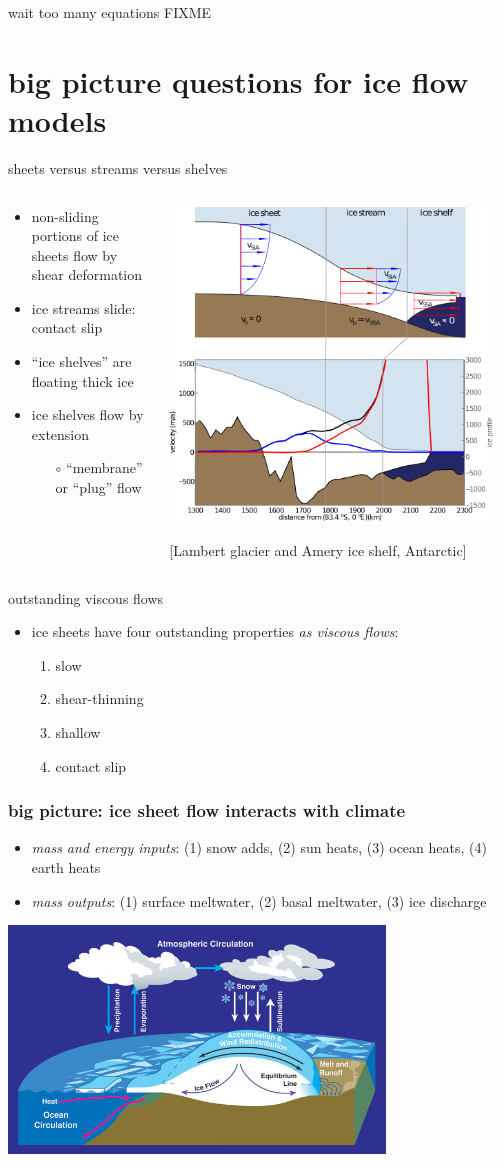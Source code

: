 \documentclass[hide notes,intlimits]{beamer}
\newcommand{\contactslipslide}{
\begin{frame}{sheets versus streams versus shelves}

\begin{columns}
\begin{column}{0.35\textwidth}
\small
\begin{itemize}
\small
\item non-sliding portions of ice sheets flow by shear deformation
\item ice streams slide: \alert{contact slip}
\item ``ice shelves'' are floating thick ice
\item ice shelves flow by extension
  \begin{itemize}
  \scriptsize
  \item[$\circ$] ``membrane'' or ``plug'' flow
  \end{itemize}
\end{itemize}
\end{column}

\begin{column}{0.65\textwidth}

\hfill\includegraphics[width=0.95\textwidth]{siassacartoon-lambert}

\begin{center}
\vspace{-0.18in}
\tiny [Lambert glacier and Amery ice shelf, Antarctic]
\end{center}
\end{column}
\end{columns}
\end{frame}
}
\begin{document}
\begin{frame}{wait too many equations}
FIXME
\end{frame}

\section[big questions]{big picture questions for ice flow models}


\contactslipslide


\begin{frame}{outstanding viscous flows}

\begin{itemize}
\item ice sheets have four outstanding properties \emph{as viscous flows}:
  \begin{enumerate}
  \item \alert{slow}
  \item \alert{shear-thinning}
  \item \alert{shallow}
  \item \alert{contact slip}
  \end{enumerate}
\end{itemize}
\end{frame}


\begin{frame}
  \frametitle{big picture: ice sheet flow interacts with climate}

\medskip
\small
\begin{itemize}
\item \emph{mass and energy inputs}: (1) snow adds, (2) sun heats, (3) ocean heats, (4) earth heats
\item \emph{mass outputs}: (1) surface meltwater, (2) basal meltwater, (3) ice discharge
\end{itemize}

\begin{center}
  \includegraphics[width=0.75\textwidth]{mass-bal-atmos}
\end{center}
\end{frame}
\end{document}
